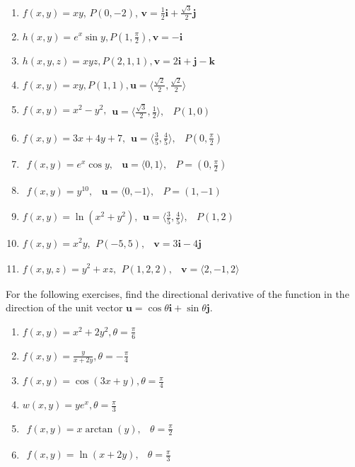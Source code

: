 \documentclass{exercises}
\begin{document}
\begin{enumerate}[resume]
\item $f(x,y)=xy$, $P(0,-2)$, $\mathbf{v}=\frac{1}{2}\mathbf{i}+\frac{\sqrt{3}}{2}\mathbf{j}$
\item $h(x,y)=e^{x}\sin y,P(1,\frac{\pi}{2}),\mathbf{v}=-\mathbf{i}$
\item $h(x,y,z)=xyz,P(2,1,1),\mathbf{v}=2\mathbf{i}+\mathbf{j}-\mathbf{k}$
\item $f(x,y)=xy,P(1,1),\mathbf{u}=\langle \frac{\sqrt{2}}{2},\frac{\sqrt{2}}{2}\rangle$
\item $f(x,y)=x^{2}-y^{2},\begin{matrix}\mathbf{u}=\langle \frac{\sqrt{3}}{2},\frac{1}{2}\rangle, & P(1,0)\end{matrix}$
\item $f(x,y)=3x+4y+7,\begin{matrix}\mathbf{u}=\langle \frac{3}{5},\frac{4}{5}\rangle, & P(0,\frac{\pi}{2})\end{matrix}$
\item $\begin{matrix}f(x,y)=e^{x}\cos y, & \mathbf{u}=\langle0,1\rangle, & P=(0,\frac{\pi}{2})\end{matrix}$
\item $\begin{matrix}f(x,y)=y^{10}, & \mathbf{u}=\langle0,-1\rangle, & P=(1,-1)\end{matrix}$
\item $f(x,y)=\ln(x^{2}+y^{2}),\begin{matrix}\mathbf{u}=\langle \frac{3}{5},\frac{4}{5}\rangle, & P(1,2)\end{matrix}$
\item $f(x,y)=x^{2}y,\begin{matrix}P(-5,5), & \mathbf{v}=3\mathbf{i}-4\mathbf{j}\end{matrix}$
\item $f(x,y,z)=y^{2}+xz,\begin{matrix}P(1,2,2), & \mathbf{v}=\langle2,-1,2\rangle\end{matrix}$
\end{enumerate}

For the following exercises, find the directional derivative of the function in the direction of the unit vector $\mathbf{u}=\cos \theta \mathbf{i}+\sin \theta \mathbf{j}$.

\begin{enumerate}[resume]
\item $f(x,y)=x^{2}+2y^{2},\theta=\frac{\pi}{6}$
\item $f(x,y)=\frac{y}{x+2y},\theta=-\frac{\pi}{4}$
\item $f(x,y)=\cos(3x+y),\theta=\frac{\pi}{4}$
\item $w(x,y)=ye^{x},\theta=\frac{\pi}{3}$
\item $\begin{matrix}f(x,y)=x\arctan(y), & \theta=\frac{\pi}{2}\end{matrix}$
\item $\begin{matrix}f(x,y)=\ln(x+2y), & \theta=\frac{\pi}{3}\end{matrix}$
\end{enumerate}
\end{document}
